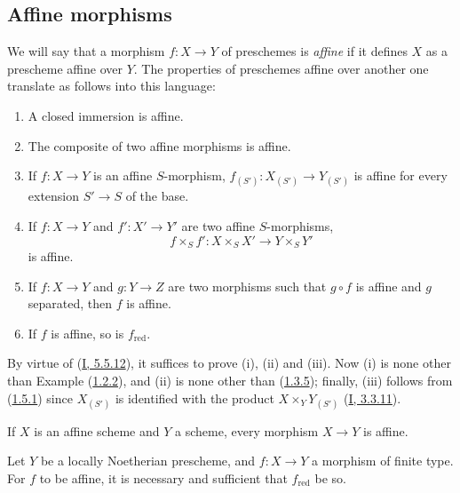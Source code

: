 \subsection{Affine morphisms}
\label{II.1.6}

\begin{env}[1.6.1]
\label{II.1.6.1}
We will say that a morphism $f:X\to Y$ of preschemes is \emph{affine} if it
defines $X$ as a prescheme affine over $Y$. The properties of
preschemes affine over another one translate as follows into this
language:
\end{env}

\begin{proposition}[1.6.2]
\label{II.1.6.2}
\begin{enumerate}
  \item[\rm(i)] A closed immersion is affine.
  \item[\rm(ii)] The composite of two affine morphisms is affine.
  \item[\rm(iii)] If $f:X\to Y$ is an affine $S$-morphism,
    $f_{(S')}:X_{(S')}\to Y_{(S')}$ is affine for every extension $S'\to S$
    of the base.
  \item[\rm(iv)] If $f:X\to Y$ and $f':X'\to Y'$ are two affine
    $S$-morphisms,
    \[
      f\times_S f':X\times_S X'\to Y\times_S Y'
    \]
    is affine.
  \item[\rm(v)] If $f:X\to Y$ and $g:Y\to Z$ are two morphisms such that
    $g\circ f$ is affine and $g$ separated, then $f$ is affine.
  \item[\rm(vi)] If $f$ is affine, so is
    $f_{\mathrm{red}}$.
\end{enumerate}
\end{proposition}

By virtue of (\hyperref[I.5.5.12]{I, 5.5.12}), it suffices to prove (i),
(ii) and (iii). Now (i) is none other than Example
(\hyperref[II.1.2.2]{1.2.2}), and (ii) is none other than
(\hyperref[II.1.3.5]{1.3.5}); finally, (iii) follows from
(\hyperref[II.1.5.1]{1.5.1}) since $X_{(S')}$ is identified with the
product $X\times_Y Y_{(S')}$ (\hyperref[I.3.3.11]{I, 3.3.11}).

\begin{corollary}[1.6.3]
\label{II.1.6.3}
If $X$ is an affine scheme and $Y$ a scheme, every morphism $X\to Y$ is
affine.
\end{corollary}

\begin{proposition}[1.6.4]
\label{II.1.6.4}
Let $Y$ be a locally Noetherian prescheme, and $f:X\to Y$ a morphism of
finite type. For $f$ to be affine, it is necessary and sufficient that
$f_{\mathrm{red}}$ be so.
\end{proposition}

